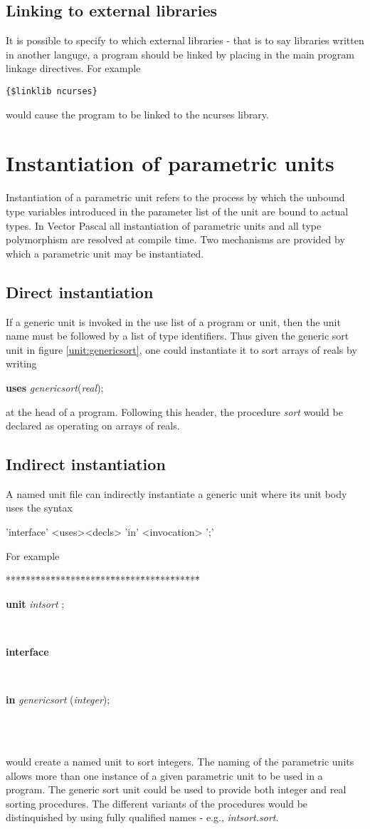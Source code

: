{\subsection{Linking to external libraries}

It is possible to specify to which external libraries - that is to say libraries
written in another languge, a program should be linked by placing in the main
program linkage directives. For example

\texttt{\{\$linklib ncurses\}}

would cause the program to be linked to the ncurses library.


\section{Instantiation of parametric units}
Instantiation of a parametric unit refers to the process by which the unbound type variables introduced
in the parameter list of the unit are bound to actual types.
In Vector Pascal all instantiation of parametric units and all type polymorphism are resolved
at compile time.
Two mechanisms are provided by which a parametric unit may be instantiated.
\subsection{Direct instantiation}
If a generic unit is invoked in the use list of a program or unit, then the unit name
must be followed by a list of type identifiers. Thus given the generic sort unit
 in figure \ref{unit:genericsort}, one could instantiate it to sort arrays of reals by
 writing

 \textsf{\textbf{uses } \textit{genericsort}(\textit{real});}

 at the head of a program. Following this header, the
 procedure \textsf{\textit{sort}} would be declared as operating
 on arrays of reals.
 \subsection{Indirect instantiation}
 A named unit file can indirectly instantiate a generic unit where its unit body
 uses the syntax

'interface' <uses><decls> 'in' <invocation> ';'

For example 


\begin{tabbing}
***\=***\=***\=***\=***\=***\=***\=***\=***\=***\=***\=***\=***\=\kill
\parbox{14cm}{\textsf{\textbf{unit}  \textit{intsort} ;}}\\
\+\parbox{14cm}{\textsf{\textbf{interface} }}\\
\parbox{14cm}{\textsf {\textbf {in } \textsf{\textit{genericsort} (\textit{integer})}; }}\\
\\
\end{tabbing}
would create a named unit to sort integers. The naming of the parametric
units allows more than one instance of a given parametric unit to be used
in a program. The generic sort unit could be used to provide both integer and
real sorting procedures. The different variants of the procedures would be
distinquished by using fully qualified names - e.g., \textsf{\textit{ intsort.sort}}.
}
